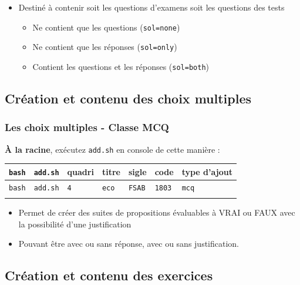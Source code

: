 \documentclass{beamer}
\begin{document}
\begin{frame}
\begin{itemize}
        \item Destiné à contenir soit les questions d'examens soit les
            questions des tests
            \begin{itemize}
                 \item Ne contient que les questions (\lstinline|sol=none|)
                 \item Ne contient que les réponses (\lstinline|sol=only|)
                 \item Contient les questions et les réponses (\lstinline|sol=both|)
             \end{itemize}
    \end{itemize}
\end{frame}

\subsection{Création et contenu des choix multiples}

\begin{frame}
    \frametitle{Les choix multiples - Classe MCQ}
    \begin{exampleblock}{\textbf{À la racine}, exécutez \lstinline|add.sh| en
    console de cette manière :}
       \begin{tabular}{lllllll}
           \lstinline|bash| & \lstinline|add.sh| & quadri & titre & sigle & code & type d'ajout
           \\ \hline
           \lstinline|bash| & \lstinline|add.sh| & \lstinline|4| & \lstinline|eco| & \lstinline|FSAB| & \lstinline|1803| & \lstinline|mcq| \\\\
       \end{tabular}
    \end{exampleblock}
    \begin{itemize}
        \item Permet de créer des suites de propositions évaluables à
            VRAI ou FAUX avec la possibilité d'une justification
        \item Pouvant être avec ou sans réponse, avec ou sans
            justification.
    \end{itemize}
\end{frame}


\subsection{Création et contenu des exercices}
\end{document}
